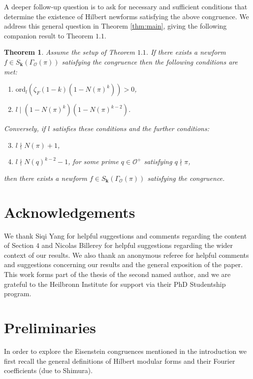 \documentclass[a4paper,oneside]{amsart}
\theoremstyle{plain}
\newtheorem{thm}{Theorem}[section]
\theoremstyle{definition}
\begin{document}
A deeper follow-up question is to ask for necessary and sufficient conditions that determine the existence of Hilbert newforms satisfying the above congruence. We address this general question in Theorem \ref{thm:main}, giving the following companion result to Theorem $1.1$.

\begin{thm}
    Assume the setup of Theorem $1.1$. If there exists a newform $f\in S_{\textbf{k}}(\Gamma_{\mathcal{O}}(\pi))$ satisfying the congruence then the following conditions are met: 
    \begin{enumerate}
        \item $\text{ord}_{l}(\zeta_F(1-k)(1-N(\pi)^k)) > 0$,
        \item $l \mid (1-N(\pi)^k)(1-N(\pi)^{k-2})$.
    \end{enumerate}
Conversely, if $l$ satisfies these conditions and the further conditions:
\begin{enumerate}\setcounter{enumi}{2}
        \item $l \nmid N(\pi)+1$, 
        \item $l \nmid N(q)^{k-2}-1$, for some prime $q\in\mathcal{O}^+$ satisfying $q\nmid\pi$,
    \end{enumerate}
    then there exists a newform $f\in S_{\textbf{k}}(\Gamma_{\mathcal{O}}(\pi))$ satisfying the congruence.
\end{thm}
\setcounter{section}{1}

\section*{Acknowledgements}
We thank Siqi Yang for helpful suggestions and comments regarding the content of Section $4$ and Nicolas Billerey for helpful suggestions regarding the wider context of our results. We also thank an anonymous referee for helpful comments and suggestions concerning our results and the general exposition of the paper. This work forms part of the thesis of the second named author, and we are grateful to the Heilbronn Institute for support via their PhD Studentship program.

\section{Preliminaries}
In order to explore the Eisenstein congruences mentioned in the introduction we first recall the general definitions of Hilbert modular forms and their Fourier coefficients (due to Shimura).
\end{document}
